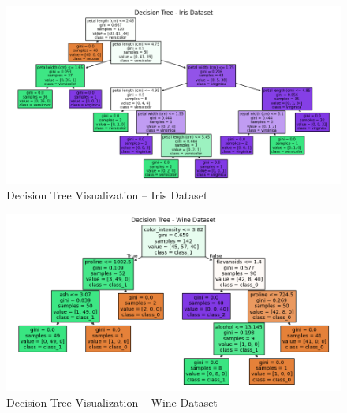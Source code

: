\documentclass[a4paper,12pt]{article}
\begin{document}
\begin{figure}[H]
    \centering
    \includegraphics[width=\textwidth]{Q4_2.png}
    \caption{Decision Tree Visualization – Iris Dataset}
\end{figure}

\begin{figure}[H]
    \centering
    \includegraphics[width=\textwidth]{Q4_3.png}
    \caption{Decision Tree Visualization – Wine Dataset}
\end{figure}
\end{document}
